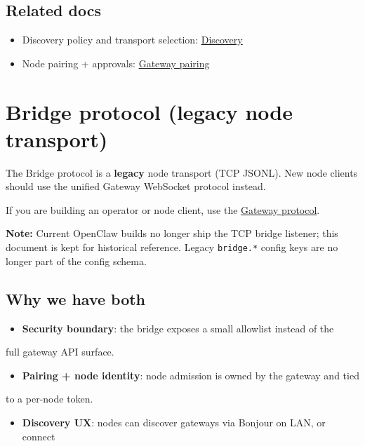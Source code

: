 \subsection{Related docs}


\begin{itemize}
  \item Discovery policy and transport selection: \href{/gateway/discovery}{Discovery}
  \item Node pairing + approvals: \href{/gateway/pairing}{Gateway pairing}
\end{itemize}



\clearpage

\section{Bridge protocol (legacy node transport)}


The Bridge protocol is a \textbf{legacy} node transport (TCP JSONL). New node clients
should use the unified Gateway WebSocket protocol instead.

If you are building an operator or node client, use the
\href{/gateway/protocol}{Gateway protocol}.

\textbf{Note:} Current OpenClaw builds no longer ship the TCP bridge listener; this document is kept for historical reference.
Legacy \texttt{bridge.*} config keys are no longer part of the config schema.

\subsection{Why we have both}


\begin{itemize}
  \item \textbf{Security boundary}: the bridge exposes a small allowlist instead of the
\end{itemize}

full gateway API surface.
\begin{itemize}
  \item \textbf{Pairing + node identity}: node admission is owned by the gateway and tied
\end{itemize}

to a per-node token.
\begin{itemize}
  \item \textbf{Discovery UX}: nodes can discover gateways via Bonjour on LAN, or connect
\end{itemize}


